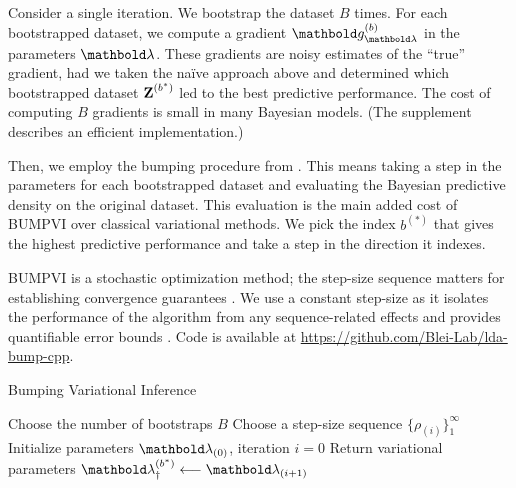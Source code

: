 Consider a single iteration. We bootstrap
the dataset $B$ times. For each bootstrapped dataset, we
compute a gradient $\mb{g}_{\mblambda}^{(b)}$ in the parameters
$\mblambda$. These gradients are noisy estimates of the ``true''
gradient, had we taken the na\"{i}ve approach above and determined which
bootstrapped dataset
$\textbf{Z}^{(b^*)}$ led to the best predictive performance. The cost of
computing $B$ gradients is small in many Bayesian models. (The
supplement describes an efficient implementation.)

Then, we employ the bumping procedure from .
This means taking a step in the parameters for each
bootstrapped dataset and evaluating the Bayesian predictive density on the
original dataset.
This evaluation is the main added cost of \gls{BUMPVI} over classical
variational methods.
We pick the index $b^{(*)}$ that gives the highest predictive performance and
take a step in the direction it indexes.

\gls{BUMPVI} is a stochastic optimization method; the step-size sequence matters
for establishing convergence guarantees \citep{robbins1951stochastic}. We use a
constant step-size as it isolates the performance of the algorithm
from any sequence-related effects and provides quantifiable error bounds
\citep{nemirovski2009robust}. Code is available at
\url{https://github.com/Blei-Lab/lda-bump-cpp}.

\begin{algorithm}[!tb]
  \caption{Bumping Variational Inference}
  \SetAlgoLined
  \DontPrintSemicolon
  \BlankLine\BlankLine
  \BlankLine
  Choose the number of bootstraps $B$\;
  Choose a step-size sequence $\{ \rho_{(i)} \}_1^\infty$\;
  Initialize parameters $\mblambda_{(0)}$, iteration $i = 0$\;
  \BlankLine
  Return variational parameters\;
  \Indp
  $\mblambda_\dagger^{(b^*)} \longleftarrow \mblambda_{(i+1)}$\;
  \Indm
  \BlankLine
  \label{alg:bump-vi}
\end{algorithm}
